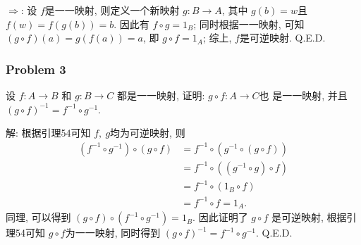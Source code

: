 \documentclass[a4paper,12pt]{ctexart}
\begin{document}
    $ \Rightarrow $: 设 $ f $是一一映射, 则定义一个新映射 $ g: B\rightarrow A $, 
    其中 $ g(b)=w $且 $ f(w)=f(g(b))=b $. 因此有 $ f\circ g=1_B $; 
    同时根据一一映射, 可知$ (g\circ f)(a)=g(f(a))=a $, 即 $ g\circ f=1_A $; 综上, $ f $是可逆映射. Q.E.D. 
% 
\subsubsection*{Problem 3}
    设 $ f: A\rightarrow B $ 和 $ g: B\rightarrow C $ 都是一一映射, 证明: $ g \circ f: A\rightarrow C $也
    是一一映射, 并且 $ ( g \circ f)^{−1} = f^{−1}\circ g^{−1}$. 
    
    解: 根据引理54可知 $ f,~g $均为可逆映射, 则
    \begin{align*}
        (f^{-1} \circ g^{-1})\circ(g\circ f)& = f^{-1} \circ (g^{-1}\circ(g\circ f))\\
         &= f^{-1} \circ ((g^{-1}\circ g)\circ f)\\
         & = f^{-1} \circ (1_B\circ f)\\
         & = f^{-1} \circ f = 1_A. 
    \end{align*}
    同理, 可以得到 $ (g\circ f)\circ(f^{-1} \circ g^{-1})=1_B $. 因此证明了 $ g \circ f $ 是可逆映射, 
    根据引理54可知 $ g\circ f $为一一映射, 同时得到 $ (g \circ f)^{−1} = f^{−1}\circ g^{−1} $. Q.E.D.
\end{document}
